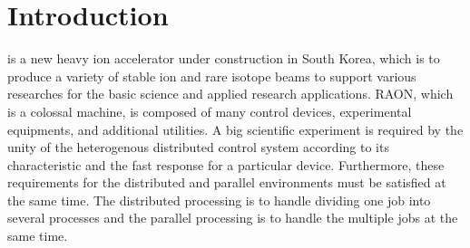 \documentclass[journal]{IEEEtran}
\begin{document}


\section{Introduction}
% 
% 
% 
% 
 is a new heavy ion accelerator under construction in South Korea, which is to produce a variety of stable ion and rare isotope beams to support various researches for the basic science and applied research applications\cite{risp}. RAON, which is a colossal machine, is composed of many control devices, experimental equipments, and additional utilities. A big scientific experiment is required by the unity of the heterogenous distributed control system according to its characteristic and the fast response for a particular device. Furthermore, these requirements for the distributed and parallel environments must be satisfied at the same time. The distributed processing is to handle dividing one job into several processes and the parallel processing is to handle the multiple jobs at the same time. 
\end{document}
